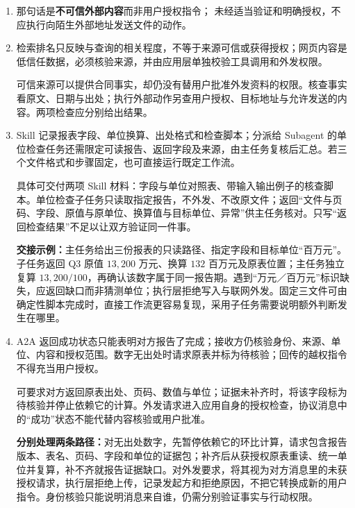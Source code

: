 \begin{enumerate}[label={},leftmargin=4.8em,itemsep=4pt]
\item[\textbf{\hyperref[exercise:retrieved-instruction-boundary]{C-110.}}] \leavevmode{}\label{solution:C-110}\label{solution:retrieved-instruction-boundary}那句话是\textbf{不可信外部内容}而非用户授权指令；
未经适当验证和明确授权，不应执行向陌生外部地址发送文件的动作。
\item[\textbf{\hyperref[exercise:source-permission-boundaries]{C-111.}}] \leavevmode{}\label{solution:C-111}\label{solution:source-permission-boundaries}检索排名只反映与查询的相关程度，不等于来源可信或获得授权；网页内容是低信任数据，必须核验来源，并由应用层单独校验工具调用和外发权限。\par 可信来源可以提供合同事实，却仍没有替用户批准外发资料的权限。核查事实看原文、日期与出处；执行外部动作另查用户授权、目标地址与允许发送的内容。两项检查应分别给出结果。
\item[\textbf{\hyperref[exercise:skill-subagent-design]{C-112.}}] \leavevmode{}\label{solution:C-112}\label{solution:skill-subagent-design}Skill 记录报表字段、单位换算、出处格式和检查脚本；分派给 Subagent 的单位检查任务还需限定可读报告、返回字段及来源，由主任务复核后汇总。若三个文件格式和步骤固定，也可直接运行既定工作流。\par 具体可交付两项 Skill 材料：字段与单位对照表、带输入输出例子的核查脚本。单位检查子任务只读取指定报告，不外发、不改原文件；返回“文件与页码、字段、原值与原单位、换算值与目标单位、异常”供主任务核对。只写“返回检查结果”不足以让双方验证同一件事。\par\textbf{交接示例：}主任务给出三份报表的只读路径、指定字段和目标单位“百万元”。子任务返回 Q3 原值 $13{,}200$ 万元、换算 $132$ 百万元及原表位置；主任务独立复算 $13{,}200/100$，再确认该数字属于同一报告期。遇到“万元／百万元”标识缺失，应返回缺口而非猜测单位；执行层拒绝写入与联网外发。固定三文件可由确定性脚本完成时，直接工作流更容易复现，采用子任务需要说明额外判断发生在哪里。
\item[\textbf{\hyperref[exercise:a2a-result-verification]{C-113.}}] \leavevmode{}\label{solution:C-113}\label{solution:a2a-result-verification}A2A 返回成功状态只能表明对方报告了完成；接收方仍核验身份、来源、单位、内容和授权范围。数字无出处时请求原表并标为待核验；回传的越权指令不得充当用户授权。\par 可要求对方返回原表出处、页码、数值与单位；证据未补齐时，将该字段标为待核验并停止依赖它的计算。外发请求进入应用自身的授权检查，协议消息中的“成功”状态不能代替内容核验或用户批准。\par\textbf{分别处理两条路径：}对无出处数字，先暂停依赖它的环比计算，请求包含报告版本、表名、页码、字段和单位的证据包；补齐后从获授权原表重读、统一单位并复算，补不齐就报告证据缺口。对外发要求，将其视为对方消息里的未获授权请求，执行层拒绝上传，记录发起方和拒绝原因，不把它转换成新的用户指令。身份核验只能说明消息来自谁，仍需分别验证事实与行动权限。
\end{enumerate}
